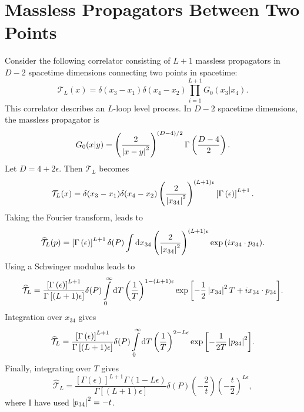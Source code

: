 \section{Massless Propagators Between Two Points}
Consider the following correlator consisting of $L + 1$ massless propagators in $D - 2$ spacetime dimensions connecting two points in spacetime:
\begin{equation}
	\mathcal{T}_{L}(x) = \delta(x_{3} - x_{1}) \delta(x_{4} - x_{2}) \prod_{i = 1}^{L+1} G_{0}(x_{3}|x_{4}).
\end{equation}
This correlator describes an $L$-loop level process. In $D - 2$ spacetime dimensions, the massless propagator is
\begin{equation}
	G_{0}(x|y) = \left( \frac{2}{\left\lvert x - y \right\rvert^{2}} \right)^{(D - 4)/2} \Gamma\left( \frac{D - 4}{2} \right).
\end{equation}
Let $D = 4 + 2 \epsilon$. Then $\mathcal{T}_{L}$ becomes
\begin{equation}
	\mathcal{T}_{L}(x) = \delta(x_{3} - x_{1}) \delta(x_{4} - x_{2}) \left( \frac{2}{\left\lvert x_{34} \right\rvert^{2}} \right)^{(L+1)\epsilon} \left[ \Gamma\left( \epsilon \right) \right]^{L+1}.
\end{equation}
Taking the Fourier transform, leads to
\begin{equation}
	\widehat{\mathcal{T}}_{L}(p) = \left[ \Gamma\left( \epsilon \right) \right]^{L+1} \delta(P) \int \mathrm{d}x_{34} \left( \frac{2}{\left\lvert x_{34} \right\rvert^{2}} \right)^{(L+1)\epsilon} \exp{\left( i x_{34} \cdot p_{34} \right)}.
\end{equation}
Using a Schwinger modulus leads to
\begin{equation}
	\widehat{\mathcal{T}}_{L} = \frac{\left[ \Gamma\left( \epsilon \right) \right]^{L+1}}{\Gamma\left[ (L+1)\epsilon \right]} \delta(P) \int\limits_{0}^{\infty} \mathrm{d}T \left( \frac{1}{T} \right)^{1 - (L+1)\epsilon} \exp{\left[ - \frac{1}{2} \left\lvert x_{34} \right\rvert^{2} T + i x_{34} \cdot p_{34} \right]}.
\end{equation}
Integration over $x_{34}$ gives
\begin{equation}
	\widehat{\mathcal{T}}_{L} = \frac{\left[ \Gamma\left( \epsilon \right) \right]^{L+1}}{\Gamma\left[ (L+1)\epsilon \right]} \delta(P) \int\limits_{0}^{\infty} \mathrm{d}T \left( \frac{1}{T} \right)^{2 - L\epsilon} \exp{\left[ - \frac{1}{2T} \left\lvert p_{34} \right\rvert^{2} \right]}.
\end{equation}
Finally, integrating over $T$ gives
\begin{equation}
	\widehat{\mathcal{T}}_{L} = \frac{\left[ \Gamma\left( \epsilon \right) \right]^{L+1} \Gamma(1 - L\epsilon) }{\Gamma\left[ (L+1)\epsilon \right]} \delta(P) \left(- \frac{2}{t} \right) \left( - \frac{t}{2} \right)^{L\epsilon},
\end{equation}
where I have used $\left\lvert p_{34} \right\rvert^{2} = -t$.
